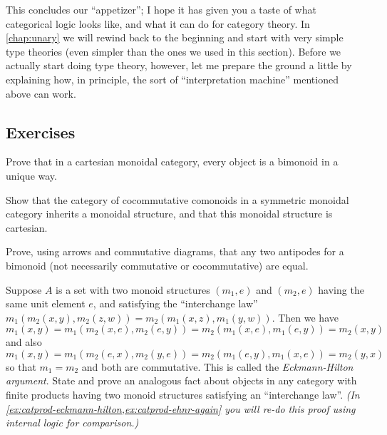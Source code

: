 This concludes our ``appetizer''; I hope it has given you a taste of what categorical logic looks like, and what it can do for category theory.
In \cref{chap:unary} we will rewind back to the beginning and start with very simple type theories (even simpler than the ones we used in this section).
Before we actually start doing type theory, however, let me prepare the ground a little by explaining how, in principle, the sort of ``interpretation machine'' mentioned above can work.


\subsection*{Exercises}

\begin{ex}\label{ex:cartmon-bimon-uniq}
  Prove that in a cartesian monoidal category, every object is a bimonoid in a unique way.
\end{ex}

\begin{ex}\label{ex:ccmon-cart}
  Show that the category of cocommutative comonoids in a symmetric monoidal category inherits a monoidal structure, and that this monoidal structure is cartesian.
\end{ex}

\begin{ex}\label{ex:antipode}
  Prove, using arrows and commutative diagrams, that any two antipodes for a bimonoid (not necessarily commutative or cocommutative) are equal.
\end{ex}

\begin{ex}\label{ex:eckmann-hilton}
  Suppose $A$ is a set with two monoid structures $(m_1,e)$ and $(m_2,e)$ having the same unit element $e$, and satisfying the ``interchange law'' $m_1(m_2(x,y),m_2(z,w)) = m_2(m_1(x,z),m_1(y,w))$.
  Then we have
  \[ m_1(x,y) = m_1(m_2(x,e),m_2(e,y)) = m_2(m_1(x,e),m_1(e,y)) = m_2(x,y) \]
  and also
  \[ m_1(x,y) = m_1(m_2(e,x),m_2(y,e)) = m_2(m_1(e,y),m_1(x,e)) = m_2(y,x) \]
  so that $m_1=m_2$ and both are commutative.
  This is called the \emph{Eckmann-Hilton argument}.
  State and prove an analogous fact about objects in any category with finite products having two monoid structures satisfying an ``interchange law''.
  \textit{(In \cref{ex:catprod-eckmann-hilton,ex:catprod-ehnr-again} you will re-do this proof using internal logic for comparison.)}
\end{ex}

